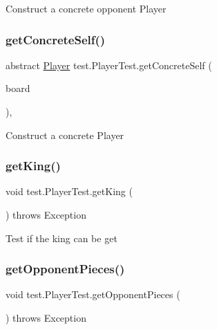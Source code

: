 Construct a concrete opponent Player \mbox{\label{classtest_1_1_player_test_a8d7c124dab2eb1050aa1b96b2d6bb2eb}} 
\subsubsection{\texorpdfstring{get\+Concrete\+Self()}{getConcreteSelf()}}
{\footnotesize\ttfamily abstract \mbox{\hyperlink{classplayers_1_1_player}{Player}} test.\+Player\+Test.\+get\+Concrete\+Self (\begin{DoxyParamCaption}\item[{\mbox{\hyperlink{classgameboard_1_1_game_board}{Game\+Board}}}]{board }\end{DoxyParamCaption})\hspace{0.3cm}{\ttfamily [abstract]}, {\ttfamily [protected]}}

Construct a concrete Player \mbox{\label{classtest_1_1_player_test_a7d877a7e126bb1e49ba84ab606dc7fc6}} 
\subsubsection{\texorpdfstring{get\+King()}{getKing()}}
{\footnotesize\ttfamily void test.\+Player\+Test.\+get\+King (\begin{DoxyParamCaption}{ }\end{DoxyParamCaption}) throws Exception}

Test if the king can be get \mbox{\label{classtest_1_1_player_test_a492f1c20801511404ba2245fb1706c96}} 
\subsubsection{\texorpdfstring{get\+Opponent\+Pieces()}{getOpponentPieces()}}
{\footnotesize\ttfamily void test.\+Player\+Test.\+get\+Opponent\+Pieces (\begin{DoxyParamCaption}{ }\end{DoxyParamCaption}) throws Exception}

